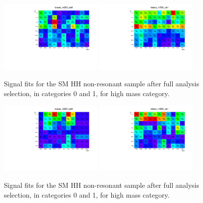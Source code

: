 \begin{figure}[h]
  \centering
  \includegraphics[width=0.45\textwidth]{figures/sec-bias/biases_m300_cat0.pdf}\hfil
  \includegraphics[width=0.45\textwidth]{figures/sec-bias/biases_m300_cat1.pdf}\hfil
  \caption{Signal fits for the SM HH non-resonant sample after full analysis selection, in categories 0 and 1, for high mass category.}
  \label{fig:bkg_bias3}
\end{figure}
\begin{figure}[h]
  \centering
  \includegraphics[width=0.45\textwidth]{figures/sec-bias/biases_m650_cat0.pdf}\hfil
  \includegraphics[width=0.45\textwidth]{figures/sec-bias/biases_m650_cat1.pdf}\hfil
  \caption{Signal fits for the SM HH non-resonant sample after full analysis selection, in categories 0 and 1, for high mass category.}
  \label{fig:bkg_bias4}
\end{figure}

